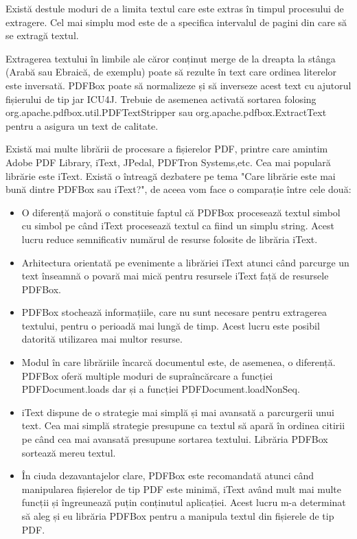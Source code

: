 \documentclass[12pt]{book}
\begin{document}
Există destule moduri de a limita textul care este extras în timpul procesului de extragere. Cel mai simplu mod este de a specifica intervalul de pagini din care să se extragă textul. 

Extragerea textului în limbile ale căror conținut merge de la dreapta la stânga  (Arabă sau Ebraică, de exemplu) poate să rezulte în text care ordinea literelor este inversată. PDFBox poate să normalizeze și să inverseze acest text cu ajutorul fișierului de tip jar ICU4J. Trebuie de asemenea activată sortarea folosing org.apache.pdfbox.util.PDFTextStripper sau org.apache.pdfbox.ExtractText pentru a asigura un text de calitate.

Există mai multe librării de procesare a fișierelor PDF, printre care amintim Adobe PDF Library, iText, JPedal, PDFTron Systems,etc. Cea mai populară librărie este iText.
Există o întreagă dezbatere pe tema "Care librărie este mai bună dintre PDFBox sau iText?", de aceea vom face o comparație între cele două:
\begin{addmargin}[4em]{1em}
	\begin{itemize}
\item O diferență majoră o constituie faptul că PDFBox procesează textul simbol cu simbol pe când iText procesează textul ca fiind un simplu string. Acest lucru reduce semnificativ numărul de resurse folosite de librăria iText. 
\item Arhitectura orientată pe evenimente a librăriei iText atunci când parcurge un text înseamnă o povară mai mică pentru resursele iText față de resursele PDFBox.
\item PDFBox stochează informațiile, care nu sunt necesare pentru extragerea textului, pentru o perioadă mai lungă de timp. Acest lucru este posibil datorită utilizarea mai multor resurse.
\item Modul în care librăriile încarcă documentul este, de asemenea, o diferență. PDFBox oferă multiple moduri de supraîncărcare a funcției PDFDocument.loads dar și a funcției PDFDocument.loadNonSeq. 
\item iText dispune de o strategie mai simplă și mai avansată a parcurgerii unui text. Cea mai simplă strategie presupune ca textul să apară în ordinea citirii pe când cea mai avansată presupune sortarea textului. Librăria PDFBox sortează mereu textul. 
\item În ciuda dezavantajelor clare, PDFBox este recomandată atunci când manipularea fișierelor de tip PDF este minimă, iText având mult mai multe funcții și îngreunează puțin conținutul aplicației. Acest lucru m-a determinat să aleg și eu librăria PDFBox pentru a manipula textul din fișierele de tip PDF. 
\end{itemize}
\end{addmargin}
\end{document}
